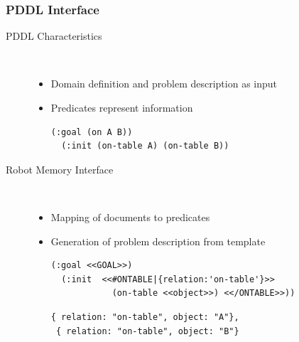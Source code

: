 \begin{frame}[fragile]
  \frametitle{PDDL Interface}
  \begin{description}
  \item[PDDL Characteristics]%
                \hfill \\
    \begin{itemize}
    \item Domain definition and problem description as input %
    \item Predicates represent information
\begin{lstlisting}[style=SmallSlidePDDL,
  framexleftmargin=1pt, xleftmargin=1pt,linewidth=9.5cm,
 morekeywords={}, numbers=none]
  (:goal (on A B))
  (:init (on-table A) (on-table B))
\end{lstlisting}
    \end{itemize}
  \item[Robot Memory Interface]%
                \hfill \\
    \begin{itemize}
    \item Mapping of documents to predicates
    \item Generation of problem description from template
\begin{lstlisting}[style=SmallSlidePDDL,
  framexleftmargin=1pt, xleftmargin=1pt,linewidth=9.5cm,
 morekeywords={}, numbers=none]
  (:goal <<GOAL>>)
  (:init  <<#ONTABLE|{relation:'on-table'}>>
            (on-table <<object>>) <</ONTABLE>>))
\end{lstlisting}
\begin{lstlisting}[style=SmallJSON,
  framexleftmargin=0pt, xleftmargin=0pt,linewidth=9.5cm,
 morekeywords={}, numbers=none]
 { relation: "on-table", object: "A"},
 { relation: "on-table", object: "B"}
\end{lstlisting}
    \end{itemize}
  \end{description}
\end{frame}

